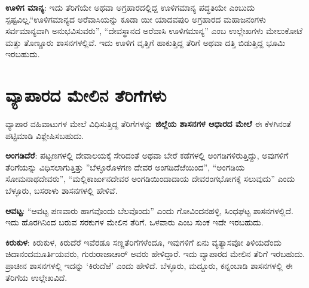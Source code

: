 \textbf{ಊಳಿಗ ಮಾನ್ಯ}: ಇದು ತೆರಿಗೆಯೇ ಅಥವಾ ಅಗ್ರಹಾರದಲ್ಲಿದ್ದ ಊಳಿಗಮಾನ್ಯ ಪದ್ಧತಿಯೇ ಎಂಬುದು ಸ್ಪಷ್ಟವಿಲ್ಲ.\break “ಊಳಿಗಮಾನ್ಯದ ಅರೆವಾಸಿಯನ್ನು ಕೂಡಾ ಯೀ ಯಾದವಪುರಿ ಅಗ್ರಹಾರದ ಮಹಾಜನಂಗಳು ಸರ್ವಮಾನ್ಯವಾಗಿ ಅನುಭವಿಸುವರು”, “ದೇವಸ್ಥಾನದ ಅರೆವಾಸಿ ಊಳಿಗಮಾನ್ಯ” ಎಂಬ ಉಲ್ಲೇಖಗಳು ಮೇಲುಕೋಟೆ ಮತ್ತು ತೊಣ್ಣೂರು ಶಾಸನಗಳಲ್ಲಿವೆ. ಇದು ಊಳಿಗ ವೃತ್ತಿಗೆ ಹಾಕುತ್ತಿದ್ದ ತೆರಿಗೆ ಅಥವಾ ದತ್ತಿ ಬಿಡುತ್ತಿದ್ದ ಭೂಮಿ ಇರಬಹುದು.

\newpage

\section*{ವ್ಯಾಪಾರದ ಮೇಲಿನ ತೆರಿಗೆಗಳು}

\vskip -4pt

ವ್ಯಾಪಾರ ವಹಿವಾಟುಗಳ ಮೇಲೆ ವಿಧಿಸುತ್ತಿದ್ದ ತೆರಿಗೆಗಳನ್ನು \textbf{ಜಿಲ್ಲೆಯ ಶಾಸನಗಳ ಆಧಾರದ ಮೇಲೆ} ಈ ಕೆಳಗಿನಂತೆ ಪಟ್ಟಿಮಾಡಿ ವಿಶ್ಲೇಷಿಸಬಹುದು.

\textbf{ಅಂಗಡಿದೆರೆ}: ಪಟ್ಟಣಗಳಲ್ಲಿ ದೇವಾಲಯಕ್ಕೆ ಸೇರಿದಂತೆ ಅಥವಾ ಬೇರೆ ಕಡೆಗಳಲ್ಲಿ ಅಂಗಡಿಗಳಿರುತ್ತಿದ್ದು, ಅವುಗಳಿಗೆ ತೆರಿಗೆಯನ್ನು ವಿಧಿಸಲಾಗುತ್ತಿತ್ತು ”ಬೆಳ್ಳೂರೊಳಗಣ ದೇವರ ಅಂಗಡಿದೆಱೆಯಿಂದ”, “ಅಂಗಡಿಯ ಸೋಮನಾಥದೇವರು”, “ಮಲ್ಲಿಕಾರ್ಜುನದೇವರ ಅಂಗಡಿಯಿಂದಾದಾಯ ದೇವರಂಗಭೋಗಕ್ಕೆ ಸಲುವುದು” ಎಂದು ಬೆಳ್ಳೂರು, ಬಸರಾಳು ಶಾಸನಗಳಲ್ಲಿ ಹೇಳಿವೆ.

\textbf{ಆವಟ್ಟ}: “ಆವಟ್ಟ ಪಣವಾರು ಹಾಗವೊಂದು ಬೆಲವೊಂದು” ಎಂದು ಗೋವಿಂದನಹಳ್ಳಿ, ಸಿಂಧಘಟ್ಟ ಶಾಸನಗಳ\-ಲ್ಲಿದೆ. ಇದು ಹೊರಗಿನಿಂದ ಬರುವ ಸರಕುಗಳ ಮೇಲಿನ ತೆರಿಗೆ. ಒಳವಾರು ಎಂಬ ಸುಂಕ ಇದೇ ಇರಬಹುದು.

\textbf{ಕಿರುಕುಳ}: ಕಿರುಕುಳ, ಕಿರುದೆರೆ ಇವೆರಡೂ ಸಣ್ಣತೆರಿಗೆಗಳೆಂದೂ, ಇವುಗಳಿಗೆ ಏನು ವ್ಯತ್ಯಾಸವೋ ತಿಳಿಯದೆಂದು ಚಿದಾನಂದಮೂರ್ತಿಯವರು, ಗುರುರಾಜಾಚಾರ್​ ಅವರು ಹೇಳಿದ್ದಾರೆ. ಇದು ವ್ಯಾಪಾರದ ಮೇಲಿನ ತೆರಿಗೆ ಇರಬಹುದು. ಪ್ರಾಚೀನ ಶಾಸನಗಳಲ್ಲಿ ಇದನ್ನು ‘ಕಿರುದೆಱೆ’ ಎಂದು ಹೇಳಿದೆ. ಬೆಳ್ಳೂರು, ಮದ್ದೂರು, ಕನ್ನಂಬಾಡಿ ಶಾಸನಗಳಲ್ಲಿ ಈ ತೆರಿಗೆಯ ಉಲ್ಲೇಖವಿದೆ.

